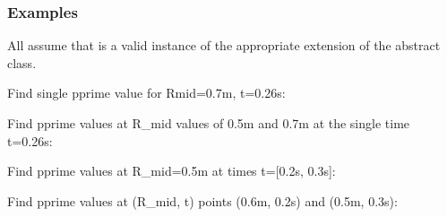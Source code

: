 \documentclass[letterpaper,10pt,english]{sphinxmanual}
\begin{document}
\begin{fulllineitems}
\begin{fulllineitems}
\begin{quote}
\begin{description}
\begin{itemize}
\end{itemize}


\end{description}\end{quote}
\subsubsection*{Examples}

All assume that  is a valid instance of the appropriate
extension of the {\hyperref[\detokenize{eqtools:eqtools.core.Equilibrium}]{}} abstract class.

Find single pprime value for Rmid=0.7m, t=0.26s:

\begin{sphinxVerbatim}[commandchars=\\\{\}]
   
\end{sphinxVerbatim}

Find pprime values at R\_mid values of 0.5m and 0.7m at the single time
t=0.26s:

\begin{sphinxVerbatim}[commandchars=\\\{\}]
  \PYG{p}{[} \PYG{p}{]} 
\end{sphinxVerbatim}

Find pprime values at R\_mid=0.5m at times t={[}0.2s, 0.3s{]}:

\begin{sphinxVerbatim}[commandchars=\\\{\}]
   \PYG{p}{[} \PYG{p}{]}
\end{sphinxVerbatim}

Find pprime values at (R\_mid, t) points (0.6m, 0.2s) and (0.5m, 0.3s):

\begin{sphinxVerbatim}[commandchars=\\\{\}]
  \PYG{p}{[} \PYG{p}{]} \PYG{p}{[} \PYG{p}{]} 
\end{sphinxVerbatim}


\end{fulllineitems}
\end{fulllineitems}
\end{document}
